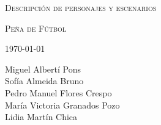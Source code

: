 \documentclass[11pt]{article}
\begin{document}
\begin{titlepage}
\centering
\vspace{4.5cm}
{\scshape\LARGE Descripción de personajes y escenarios\par}
{\scshape\LARGE Peña de Fútbol\par}
\vspace{1.5cm}

{\scshape\large \today \par}
\vspace{14cm}

{Miguel Albertí Pons\\
Sofía Almeida Bruno\\
Pedro Manuel Flores Crespo\\
María Victoria Granados Pozo\\
Lidia Martín Chica
\par}

\end{titlepage}


\newpage
\end{document}
